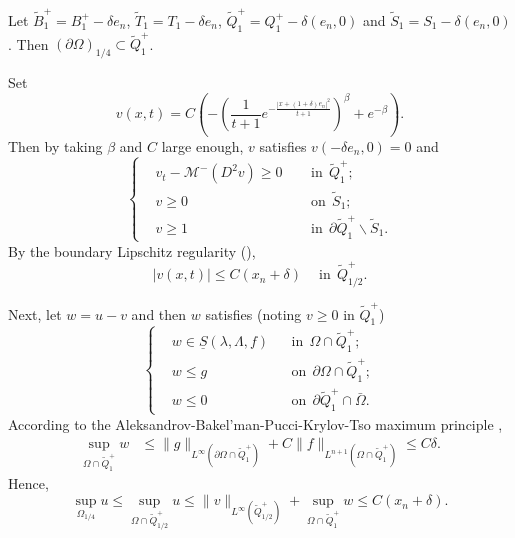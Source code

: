 \documentclass[preprint,12pt]{elsarticle}
\theoremstyle{definition}
\theoremstyle{remark}
\numberwithin{equation}{section}
\begin{document}
\proof Let $\tilde{B}^{+}_{1}=B^{+}_{1}-\delta e_n $, $\tilde{T}_1=T_1-\delta e_n$, $\tilde{Q}^{+}_{1}=Q^{+}_{1}-\delta (e_n,0) $ and $\tilde{S}_1=S_1-\delta (e_n,0)$. Then $(\partial \Omega)_{1/4}\subset \tilde{Q}^{+}_{1}$.

Set
\begin{equation*}
  v(x,t)=C\left(-\left(\frac{1}{t+1}e^{-\frac{|x+(1+\delta)e_n|^2}{t+1}}\right)^{\beta}
+e^{-\beta}\right).
\end{equation*}
Then by taking $\beta$ and $C$ large enough, $v$ satisfies $v(-\delta e_n,0)=0$ and
\begin{equation}\label{e.uniform.v}
\left\{\begin{aligned}
&v_t-\mathcal{M}^-(D^2v)\geq 0&& ~~\mbox{in}~~\tilde Q^+_{1};\\
&v\geq 0&& ~~\mbox{on}~~\tilde S_{1};\\
&v\geq 1&&~~\mbox{in}~~\partial \tilde Q^+_{1}\backslash \tilde S_{1}.
\end{aligned}\right.
\end{equation}
By the boundary Lipschitz regularity (),
\begin{equation*}
  |v(x,t)|\leq C(x_n+\delta)~~~~\mbox{ in}~~\tilde{Q}^+_{1/2}.
\end{equation*}

Next, let $w=u-v$ and then $w$ satisfies (noting $v\geq 0$ in $\tilde Q^+_{1}$)
\begin{equation*}
    \left\{
    \begin{aligned}
      &w\in \underline{S}(\lambda,\Lambda , f) &&\mbox{in}~~ \Omega \cap \tilde{Q}^{+}_{1}; \\
      &w\leq g &&\mbox{on}~~\partial \Omega \cap \tilde{Q}^{+}_{1};\\
      &w\leq 0 &&\mbox{on}~~\partial \tilde{Q}^{+}_{1}\cap \bar{\Omega}.
    \end{aligned}
    \right.
\end{equation*}
According to the Aleksandrov-Bakel’man-Pucci-Krylov-Tso maximum principle \cite[Theorem 3.14]{MR1135923},
\begin{equation*}
  \begin{aligned}
\sup_{\Omega \cap \tilde{Q}^{+}_{1}} w& \leq\|g\|_{L^{\infty }(\partial \Omega \cap \tilde{Q}^{+}_{1})}+C\|f\|_{L^{n+1}(\Omega \cap \tilde{Q}^{+}_{1})}\leq C\delta.
  \end{aligned}
\end{equation*}
Hence,
\begin{equation*}
\sup_{\Omega_{1/4}} u\leq \sup_{\Omega\cap \tilde{Q}_{1/2}^+} u \leq \|v\|_{L^{\infty}(\tilde{Q}_{1/2}^+)}+\sup_{\Omega \cap \tilde{Q}^{+}_{1}} w\leq C(x_n+\delta).
\end{equation*}
\end{document}
